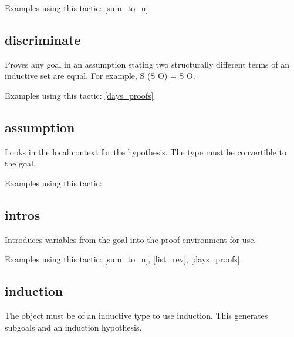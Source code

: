 \noindent
Examples using this tactic: 
\ref{sum_to_n}




\subsection{discriminate} \label{discriminate}
Proves any goal in an assumption stating two structurally different terms of an inductive set are equal. For example, S (S O) = S O.

\noindent
Examples using this tactic: 
\ref{days_proofs}




\subsection{assumption} \label{assumption}
Looks in the local context for the hypothesis. The type must be convertible to the goal.

\noindent
Examples using this tactic: 




\subsection{intros} \label{intros}
Introduces variables from the goal into the proof environment for use.

\noindent
Examples using this tactic: 
\ref{sum_to_n}, \ref{list_rev}, \ref{days_proofs}



%
%




\subsection{induction} \label{induction}
The object must be of an inductive type to use induction. 
This generates subgoals and an induction hypothesis.

